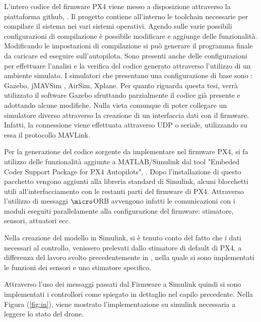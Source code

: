 L'intero codice del firmware PX4 viene messo a disposizione attraverso la piattaforma github, \cite{PX4FIRMWARE}. Il progetto contiene all'interno le toolchain necessarie per compilare il sistema nei vari sistemi operativi. Agendo sulle varie possibili configurazioni di compilazione è possibile modificare e aggiunge delle funzionalità. Modificando le impostazioni di compilazione si può generare il programma finale da caricare ed eseguire sull'autopilota.
Sono presenti anche delle configurazioni per effettuare l'analisi e la verifica del codice generato attraverso l'utilizzo di un ambiente simulato. I simulatori che presentano una configurazione di base sono : Gazebo, jMAVSim , AirSim, Xplane. Per quanto riguarda questa tesi, verrà utilizzato il software Gazebo sfruttando parzialmente il codice già presente e adottando alcune modifiche. Nulla vieta comunque di poter collegare un simulatore diverso attraverso la creazione di un interfaccia dati con il firmware. Infatti, la connessione viene effettuata attraverso UDP o seriale, utilizzando su essa il protocollo MAVLink.

Per la generazione del codice sorgente da implementare nel firmware PX4, si fa utilizzo delle funzionalità aggiunte a MATLAB/Simulink dal tool "Embeded Coder Support Package for PX4 Autopilots", \cite{PX4MATLAB}. Dopo l'installazione di questo pacchetto vengono aggiunti alla libreria standard di Simulink, alcuni blocchetti utili all'interfacciamento con le restanti parti del firmware di PX4. Attraverso l'utilizzo di messaggi $\micro$ORB avvengono infatti le comunicazioni con i moduli eseguiti parallelamente alla configurazione del firmware: stimatore, sensori, attuatori ecc.

Nella creazione del modello in Simulink, si è tenuto conto del fatto che i dati necessari al controllo, venissero prelevati dallo stimatore di default di PX4, a differenza del lavoro svolto precedentemente in \cite{DesTestCarm}, nella quale si sono implementati le funzioni dei sensori e uno stimatore specifico.

Attraverso l'uso dei messaggi passati dal Firmware a Simulink quindi si sono implementati i controllori come spiegato in dettaglio nel capilo precedente. Nella Figura (\ref{fig:in}), viene mostrato l'implementazione su simulink necessaria a leggere lo stato del drone.

